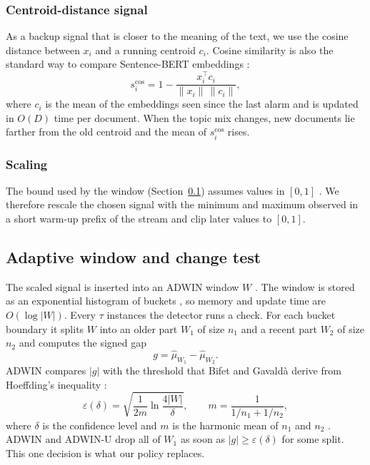 \documentclass[conference]{IEEEtran}
\begin{document}
\subsubsection{Centroid-distance signal}
As a backup signal that is closer to the meaning of the text, we use the cosine distance \cite{salton1975} between $x_i$ and a running centroid $c_i$. Cosine similarity is also the standard way to compare Sentence-BERT embeddings \cite{reimers2019}:
\begin{equation}
s_i^{\mathrm{cos}}=1-\frac{x_i^{\top}c_i}{\lVert x_i\rVert\,\lVert c_i\rVert},
\label{eq:cos}
\end{equation}
where $c_i$ is the mean of the embeddings seen since the last alarm and is updated in $O(D)$ time per document. When the topic mix changes, new documents lie farther from the old centroid and the mean of $s_i^{\mathrm{cos}}$ rises.

\subsubsection{Scaling}
The bound used by the window (Section~\ref{sec:window}) assumes values in $[0,1]$ \cite{bifet2007}. We therefore rescale the chosen signal with the minimum and maximum observed in a short warm-up prefix of the stream and clip later values to $[0,1]$.

\subsection{Adaptive window and change test}
\label{sec:window}

The scaled signal is inserted into an ADWIN window $W$ \cite{bifet2007}. The window is stored as an exponential histogram of buckets \cite{datar2002}, so memory and update time are $O(\log|W|)$. Every $\tau$ instances the detector runs a check. For each bucket boundary it splits $W$ into an older part $W_1$ of size $n_1$ and a recent part $W_2$ of size $n_2$ and computes the signed gap
\begin{equation}
g=\hat\mu_{W_1}-\hat\mu_{W_2}.
\end{equation}
ADWIN compares $|g|$ with the threshold that Bifet and Gavald\`a \cite{bifet2007} derive from Hoeffding's inequality \cite{hoeffding1963}:
\begin{equation}
\varepsilon(\delta)=\sqrt{\frac{1}{2m}\ln\frac{4|W|}{\delta}},\qquad m=\frac{1}{1/n_1+1/n_2},
\label{eq:eps}
\end{equation}
where $\delta$ is the confidence level and $m$ is the harmonic mean of $n_1$ and $n_2$ \cite{bifet2007}. ADWIN and ADWIN-U drop all of $W_1$ as soon as $|g|\ge\varepsilon(\delta)$ for some split. This one decision is what our policy replaces.
\end{document}
